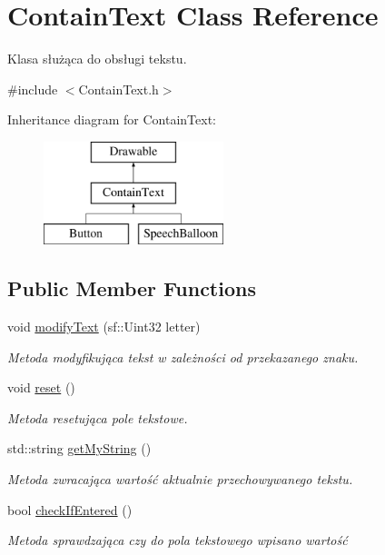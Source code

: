 \hypertarget{class_contain_text}{}\section{Contain\+Text Class Reference}
\label{class_contain_text}


Klasa służąca do obsługi tekstu.  




{\ttfamily \#include $<$Contain\+Text.\+h$>$}

Inheritance diagram for Contain\+Text\+:\begin{figure}[H]
\begin{center}
\leavevmode
\includegraphics[height=3.000000cm]{class_contain_text}
\end{center}
\end{figure}
\subsection*{Public Member Functions}
\begin{DoxyCompactItemize}
\item 
void \mbox{\hyperlink{class_contain_text_a2b6f106829ba9f0d709f503515669214}{modify\+Text}} (sf\+::\+Uint32 letter)
\begin{DoxyCompactList}\small\item\em Metoda modyfikująca tekst w zależności od przekazanego znaku. \end{DoxyCompactList}\item 
\mbox{\label{class_contain_text_a7730b95d391cb91303ccef9e333073c5}} 
void \mbox{\hyperlink{class_contain_text_a7730b95d391cb91303ccef9e333073c5}{reset}} ()
\begin{DoxyCompactList}\small\item\em Metoda resetująca pole tekstowe. \end{DoxyCompactList}\item 
std\+::string \mbox{\hyperlink{class_contain_text_a545545d8deb760df82ef9f971af6d7e2}{get\+My\+String}} ()
\begin{DoxyCompactList}\small\item\em Metoda zwracająca wartość aktualnie przechowywanego tekstu. \end{DoxyCompactList}\item 
bool \mbox{\hyperlink{class_contain_text_a926b999593acea596c1f33b9ca66ea04}{check\+If\+Entered}} ()
\begin{DoxyCompactList}\small\item\em Metoda sprawdzająca czy do pola tekstowego wpisano wartość \end{DoxyCompactList}\end{DoxyCompactItemize}

